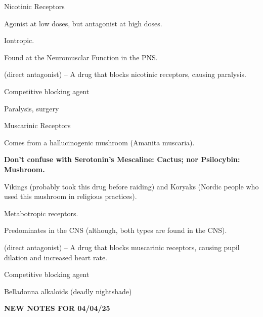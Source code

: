 \begin{coloredlist}
    \item Nicotinic Receptors
    \begin{coloredlist}
        \item Agonist at low doses, but antagonist at high doses.
        \item Iontropic.
        \item Found at the Neuromusclar Function in the PNS.
        \item {} (direct antagonist) -- A drug that blocks nicotinic receptors, causing paralysis.
        \begin{coloredlist}
            \item Competitive blocking agent
            \item Paralysis, surgery
        \end{coloredlist}
    \end{coloredlist}
    \item Muscarinic Receptors
    \begin{coloredlist}
        \item Comes from a hallucinogenic mushroom (Amanita muscaria).
        \begin{coloredlist}
            \item \textbf{Don't confuse with Serotonin's Mescaline: Cactus; nor Psilocybin: Mushroom.}
        \end{coloredlist}
        \item Vikings (probably took this drug before raiding) and Koryaks (Nordic people who used this mushroom in religious practices).
        \item Metabotropic receptors.
        \item Predominates in the CNS (although, both types are found in the CNS).
        \item {} (direct antagonist) -- A drug that blocks muscarinic receptors, causing pupil dilation and increased heart rate.
        \begin{coloredlist}
            \item Competitive blocking agent
            \item Belladonna alkaloids (deadly nightshade)
        \end{coloredlist}
    \end{coloredlist}
\end{coloredlist}

\begin{center}
    \textbf{NEW NOTES FOR 04/04/25} \\
    \hrulefill
\end{center}

